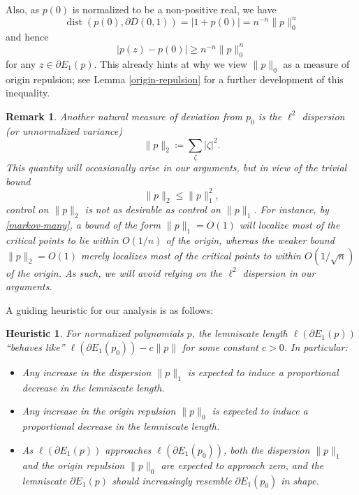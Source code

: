 \documentclass[12pt]{amsart}
\newtheorem{heuristic}{Heuristic}[section]
\newtheorem{remark}{Remark}[section]
\newcommand{\dist}{\operatorname{dist}}
\begin{document}
Also, as $p(0)$ is normalized to be a non-positive real, we have
$$ \dist(p(0), \partial D(0,1)) = |1+p(0)| = n^{-n} \|p\|_0^n$$
and hence
\begin{equation}\label{npz}
    |p(z) - p(0)| \geq n^{-n} \|p\|_0^n
\end{equation}
for any $z \in \partial E_1(p)$. This already hints at why we view $\|p\|_0$ as a measure of origin repulsion; see Lemma \ref{origin-repulsion} for a further development of this inequality.

\begin{remark}\label{l2}  Another natural measure of deviation from $p_0$ is the \emph{$\ell^2$ dispersion} (or \emph{unnormalized variance})
\begin{equation}\label{l2-def}
 \|p\|_2 \coloneqq \sum_\zeta |\zeta|^2.
\end{equation}
This quantity will occasionally arise in our arguments, but in view of the trivial bound
\begin{equation}\label{l1-l2}
    \|p\|_2 \leq \|p\|_1^2,
\end{equation}
control on $\|p\|_2$ is not as desirable as control on $\|p\|_1$.  For instance, by \eqref{markov-many}, a bound of the form $\|p\|_1 = O(1)$ will localize most of the critical points to lie within $O(1/n)$ of the origin, whereas the weaker bound $\|p\|_2 = O(1)$ merely localizes most of the critical points to within $O(1/\sqrt{n})$ of the origin.  As such, we will avoid relying on the $\ell^2$ dispersion in our arguments.
\end{remark}

A guiding heuristic for our analysis is as follows:

\begin{heuristic}\label{main-heuristic}  For normalized polynomials $p$, the lemniscate length $\ell(\partial E_1(p))$ ``behaves like'' $\ell(\partial E_1(p_0)) - c \|p\|$ for some constant $c>0$.  In particular:
\begin{itemize}
    \item[(i)] Any increase in the dispersion $\|p\|_1$ is expected to induce a proportional decrease in the lemniscate length.
    \item[(ii)] Any increase in the origin repulsion $\|p\|_0$ is expected to induce a proportional decrease in the lemniscate length.
    \item[(iii)]  As $\ell(\partial E_1(p))$ approaches $\ell(\partial E_1(p_0))$, both the dispersion $\|p\|_1$ and the origin repulsion $\|p\|_0$ are expected to approach zero, and the lemniscate $\partial E_1(p)$ should increasingly resemble $\partial E_1(p_0)$ in shape.
\end{itemize}
\end{heuristic}
\end{document}
